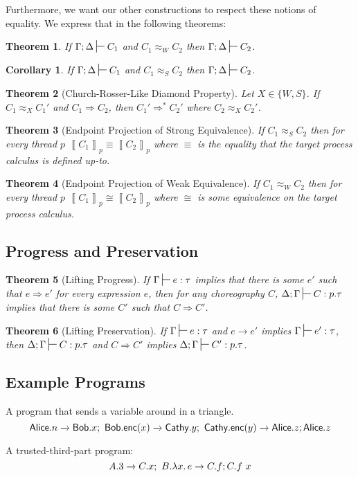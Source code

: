 \documentclass{article}
\newtheorem{thm}{Theorem}
\newtheorem{cor}{Corollary}
\theoremstyle{definition}
\newcommand{\To}{\Rightarrow}
\newcommand{\ceq}{\approx}
\newcommand{\own}[2]{#1.#2}
\newcommand{\send}[3][]{#2\nolinebreak \mathrel{\xrightarrow{#1}}\nolinebreak #3}
\newcommand{\proves}[1][]{\sststile{}{#1}}
\newcommand{\transb}[1]{\left\llbracket #1 \right\rrbracket}
\begin{document}
Furthermore, we want our other constructions to respect these notions of equality.
We express that in the following theorems:
\begin{thm}
  If $\Gamma; \Delta \proves C_1$ and $C_1 \ceq_W C_2$ then $\Gamma; \Delta \proves C_2$.
\end{thm}
\begin{cor}
  If $\Gamma; \Delta \proves C_1$ and $C_1 \ceq_S C_2$ then $\Gamma; \Delta \proves C_2$.
\end{cor}

\begin{thm}[Church-Rosser-Like Diamond Property]
  Let $X \in \{W,S\}$.
  If $C_1 \ceq_X C_1'$ and $C_1 \To C_2$, then $C_1' \To^\ast C_2'$ where $C_2 \ceq_X C_2'$.
\end{thm}

\begin{thm}[Endpoint Projection of Strong Equivalence]
  If $C_1 \ceq_S C_2$ then for every thread $p$ $\transb{C_1}_p \equiv \transb{C_2}_p$ where $\equiv$ is the equality that the target process calculus is defined up-to.
\end{thm}
\begin{thm}[Endpoint Projection of Weak Equivalence]
  If $C_1 \ceq_W C_2$ then for every thread $p$ $\transb{C_1}_p \cong \transb{C_2}_p$ where $\cong$ is some equivalence on the target process calculus.
\end{thm}

\subsection{Progress and Preservation}
\label{sec:progr-pres-mmc}
\begin{thm}[Lifting Progress]
  If $\Gamma \proves e : \tau$ implies that there is some $e'$ such that $e \To e'$ for every expression $e$, then for any choreography $C$, $\Delta; \Gamma \proves C : p.\tau$ implies that there is some $C'$ such that $C \To C'$.
\end{thm}

\begin{thm}[Lifting Preservation]
  If $\Gamma \proves e : \tau$ and $e \to e'$ implies $\Gamma \proves e' : \tau$, then $\Delta; \Gamma \proves C : p.\tau$ and $C \To C'$ implies $\Delta; \Gamma \proves C' : p.\tau$.
\end{thm}


\subsection{Example Programs}
A program that sends a variable around in a triangle.
$$\send{\own{\textsf{Alice}}{n}}{\own{\textsf{Bob}}{x}};~\send{\own{\textsf{Bob}}{\textsf{enc}(x)}}{\own{\textsf{Cathy}}{y}};~\send{\own{\textsf{Cathy}}{\textsf{enc}(y)}}{\own{\textsf{Alice}}{z}}; \own{\textsf{Alice}}{z}$$

A trusted-third-part program:
$$\send{\own{A}{3}}{\own{C}{x}};~\send{\own{B}{\lambda x.\,e}}{\own{C}{f}}; \own{C}{f~x}$$


\end{document}
